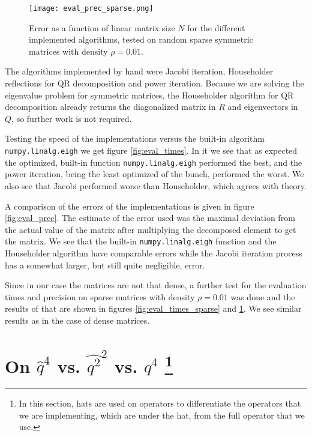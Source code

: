 \documentclass[10pt,a4paper,twocolumn]{article}
\begin{document}
\begin{figure}
\centering
\captionsetup{justification=centering}
\texttt{[image: eval\_prec\_sparse.png]}
\caption{Error as a function of linear matrix size $N$ for the different implemented algorithms, tested on random sparse symmetric matrices with density $\rho=0.01$.}
\label{fig:eval_prec_sparse}
\end{figure}

The algorithms implemented by hand were Jacobi iteration, Householder reflections for QR decomposition and power iteration. Because we are solving the eigenvalue problem for symmetric matrices, the Householder algorithm for QR decomposition already returns the diagonalized matrix in $R$ and eigenvectors in $Q$, so further work is not required.

Testing the speed of the implementations versus the built-in algorithm \texttt{numpy.linalg.eigh} \cite{eigh} we get figure \ref{fig:eval_times}. In it we see that as expected the optimized, built-in function \texttt{numpy.linalg.eigh} performed the best, and the power iteration, being the least optimized of the bunch, performed the worst. We also see that Jacobi performed worse than Householder, which agrees with theory. \cite{zagar}

A comparison of the errors of the implementations is given in figure \ref{fig:eval_prec}. The estimate of the error used was the maximal deviation from the actual value of the matrix after multiplying the decomposed element to get the matrix. We see that the built-in \texttt{numpy.linalg.eigh} function and the Householder algorithm have comparable errors while the Jacobi iteration process has a somewhat larger, but still quite negligible, error.

Since in our case the matrices are not that dense, a further test for the evaluation times and precision on sparse matrices with density $\rho = 0.01$ was done and the results of that are shown in figures \ref{fig:eval_times_sparse} and \ref{fig:eval_prec_sparse}. We see similar results as in the case of dense matrices.


\section{On $\widehat{q}^4$ vs. $\widehat{q^2}^2$ vs. $\widehat{q^4}$ \footnote{In this section, hats are used on operators to differentiate the operators that we are implementing, which are under the hat, from the full operator that we use.}}\label{sec:q_methods}
\end{document}
